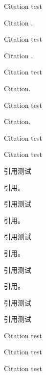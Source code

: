 \documentclass[UTF8,scheme=plain,fontset=fandol]{ctexart}
\begin{document}
\START
\showoutput

Citation \citet{jon88} test\par
Citation \citet{jon88}.\par
Citation \citet[42]{jon89} test\par
Citation \citet[42]{jon89}.\par
Citation\citep{jon88} test\par
Citation\citep{jon88}.\par
Citation\citep[42]{jon89} test\par
Citation\citep[42]{jon89}.\par
Citation \citep[see][]{jon90} test\par
Citation \citep[see][42]{jon90} test\par

引用\citet{lzp1}测试\par
引用\citet{lzp1}。\par
引用\citet[42]{lzp2}测试\par
引用\citet[42]{lzp2}。\par
引用\citep{lzp1}测试\par
引用\citep{lzp1}。\par
引用\citep[42]{lzp2}测试\par
引用\citep[42]{lzp2}。\par
引用\citep[见][]{lzp3}测试\par
引用\citep[见][42]{lzp3}测试\par

Citation\citep{jon88} test\par
Citation\citep{jon89,jon90} test\par
Citation\citep{lzp1,lzp2,lzp3} test\par

\clearpage
\OMIT


\end{document}
